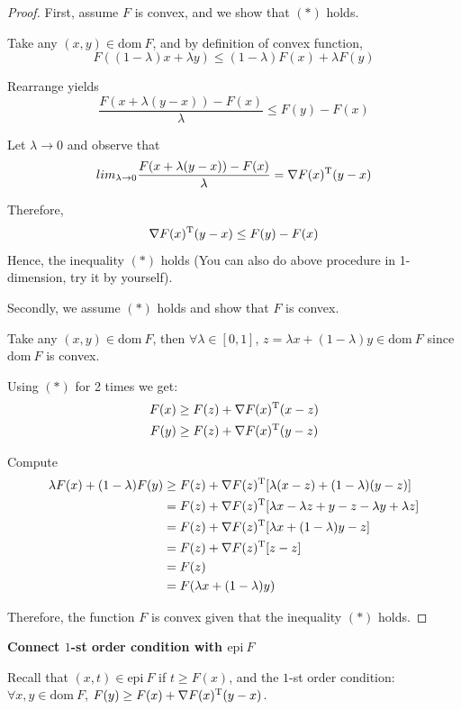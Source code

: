 \begin{proof}
First, assume $F$ is convex, and we show that $(*)$ holds. 

Take any $(x,y)\in \text{dom}\ F$, and by definition of convex function,
$$F((1-\lambda)x+\lambda y) \leq (1-\lambda)F(x) + \lambda F(y)$$

Rearrange yields
$$\frac{F(x+\lambda(y-x)) - F(x)}{\lambda} \leq F(y) - F(x)$$

Let $\lambda \rightarrow 0$ and observe that
$$lim_{\lambda\rightarrow 0} \frac{F(x+\lambda(y-x)) - F(x)}{\lambda} = \nabla F(x)^{{\rm T}}(y-x)$$

Therefore,
$$\nabla F(x)^{{\rm T}}(y-x)\leq F(y) - F(x)$$
Hence, the inequality $(*)$ holds (You can also do above procedure in 1-dimension, try it by yourself).


Secondly, we assume $(*)$ holds and show that $F$ is convex.

Take any $(x,y)\in \text{dom}\ F$, then $\forall \lambda\in[0,1]$, $z= \lambda x + (1-\lambda)y \in \text{dom}\ F$ since $\text{dom}\ F$ is convex.

Using $(*)$ for 2 times we get:
\begin{align*}
F(x) &\geq F(z) + \nabla F(x)^{{\rm T}}(x-z)\\
F(y) &\geq F(z) + \nabla F(x)^{{\rm T}}(y-z)
\end{align*} 

Compute
\begin{align*}
\lambda F(x)+(1-\lambda)F(y) &\geq F(z) + \nabla F(z)^{{\rm T}}[\lambda (x-z)+(1-\lambda)(y-z)]\\
&= F(z) + \nabla F(z)^{{\rm T}}[\lambda x - \lambda z + y - z - \lambda y +\lambda z]\\
&= F(z) + \nabla F(z)^{{\rm T}}[\lambda x + (1-\lambda)y - z]\\
&= F(z) + \nabla F(z)^{{\rm T}}[z - z]\\
&= F(z)\\
&= F(\lambda x + (1-\lambda )y)
\end{align*}

Therefore, the function $F$ is convex given that the inequality $(*)$ holds.
\end{proof}

\vspace{0.3cm}
\noindent\textbf{Connect $1$-st order condition with $\text{epi}\ F$}

Recall that $(x,t)\in \text{epi}\ F$ if $t\geq F(x)$, and the $1$-st order condition: $\forall x,y \in \text{dom}\ F$, $F(y)\geq F(x) + \nabla F(x)^{{\rm T}}(y-x)$.

